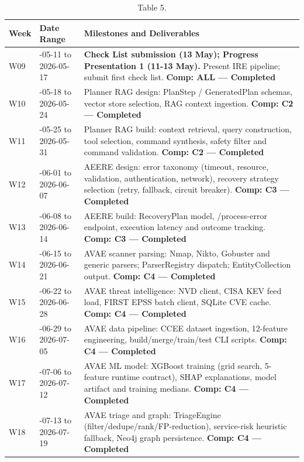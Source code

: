 \documentclass[10pt,journal,onecolumn]{IEEEtran}
\begin{document}
\begin{table}[h]
\caption{Table 5.}
\label{tab:t5}
\begin{tabularx}{\columnwidth}{l >{\raggedright\arraybackslash}X >{\raggedright\arraybackslash}X}
\toprule
\textbf{Week} & \textbf{Date Range} & \textbf{Milestones and Deliverables}\\
\midrule
W09 & 2026-05-11 to 2026-05-17 & \textbf{Check List submission (13 May); Progress Presentation 1 (11-13 May).} Present IRE pipeline; submit first check list. \textbf{Comp: ALL --- Completed}\\
W10 & 2026-05-18 to 2026-05-24 & Planner RAG design: PlanStep / GeneratedPlan schemas, vector store selection, RAG context ingestion. \textbf{Comp: C2 --- Completed}\\
W11 & 2026-05-25 to 2026-05-31 & Planner RAG build: context retrieval, query construction, tool selection, command synthesis, safety filter and command validation. \textbf{Comp: C2 --- Completed}\\
W12 & 2026-06-01 to 2026-06-07 & AEERE design: error taxonomy (timeout, resource, validation, authentication, network), recovery strategy selection (retry, fallback, circuit breaker). \textbf{Comp: C3 --- Completed}\\
W13 & 2026-06-08 to 2026-06-14 & AEERE build: RecoveryPlan model, /process-error endpoint, execution latency and outcome tracking. \textbf{Comp: C3 --- Completed}\\
W14 & 2026-06-15 to 2026-06-21 & AVAE scanner parsing: Nmap, Nikto, Gobuster and generic parsers; ParserRegistry dispatch; EntityCollection output. \textbf{Comp: C4 --- Completed}\\
W15 & 2026-06-22 to 2026-06-28 & AVAE threat intelligence: NVD client, CISA KEV feed load, FIRST EPSS batch client, SQLite CVE cache. \textbf{Comp: C4 --- Completed}\\
W16 & 2026-06-29 to 2026-07-05 & AVAE data pipeline: CCEE dataset ingestion, 12-feature engineering, build/merge/train/test CLI scripts. \textbf{Comp: C4 --- Completed}\\
W17 & 2026-07-06 to 2026-07-12 & AVAE ML model: XGBoost training (grid search, 5-feature runtime contract), SHAP explanations, model artifact and training medians. \textbf{Comp: C4 --- Completed}\\
W18 & 2026-07-13 to 2026-07-19 & AVAE triage and graph: TriageEngine (filter/dedupe/rank/FP-reduction), service-risk heuristic fallback, Neo4j graph persistence. \textbf{Comp: C4 --- Completed}\\

\end{tabularx}
\end{table}
\end{document}
